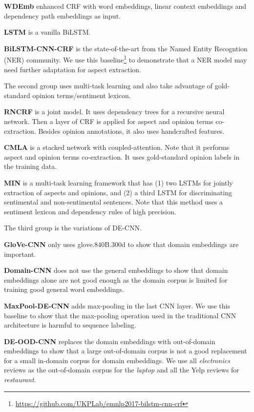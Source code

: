 \textbf{WDEmb} \cite{yin2016unsupervised} enhanced CRF with word embeddings, linear context embeddings and dependency path embeddings as input.

\textbf{LSTM} \cite{liu2015fine,li2017deep} is a vanilla BiLSTM.

\textbf{BiLSTM-CNN-CRF} \cite{Reimers:2017:EMNLP} is the state-of-the-art from the Named Entity Recogntion (NER) community. We use this baseline\footnote{\url{https://github.com/UKPLab/emnlp2017-bilstm-cnn-crf} } to demonstrate that a NER model may need further adaptation for aspect extraction.

The second group uses multi-task learning and also take advantage of gold-standard opinion terms/sentiment lexicon.

\textbf{RNCRF} \cite{wang2016recursive} is a joint model. It uses dependency trees for a recursive neural network. Then a layer of CRF is applied for aspect and opinion terms co-extraction. 
Besides opinion annotations, it also uses handcrafted features.

\textbf{CMLA} \cite{wang2017coupled} is a stacked network with coupled-attention. Note that it performs aspect and opinion terms co-extraction. It uses gold-standard opinion labels in the training data.

\textbf{MIN} \cite{li2017deep} is a multi-task learning framework that has (1) two LSTMs for jointly extraction of aspects and opinions, and (2) a third LSTM for discriminating sentimental and non-sentimental sentences. 
Note that this method uses a sentiment lexicon and dependency rules of high precision. 

The third group is the variations of DE-CNN.

\textbf{GloVe-CNN} only uses glove.840B.300d to show that domain embeddings are important. 

\textbf{Domain-CNN} does not use the general embeddings to show that domain embeddings alone are not good enough as the domain corpus is limited for training good general word embeddings.

\textbf{MaxPool-DE-CNN} adds max-pooling in the last CNN layer. We use this baseline to show that the max-pooling operation used in the traditional CNN architecture is harmful to sequence labeling.

\textbf{DE-OOD-CNN} replaces the domain embeddings with out-of-domain embeddings to show that a large out-of-domain corpus is not a good replacement for a small in-domain corpus for domain embeddings.
We use all \textit{electronics} reviews as the out-of-domain corpus for the \textit{laptop} and all the Yelp reviews for \textit{restaurant}.

